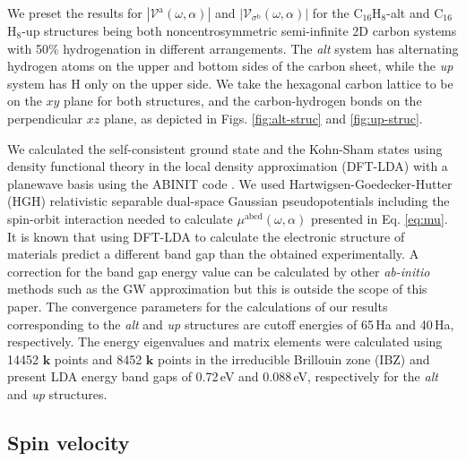 \documentclass[prb,11pt,tightenlines,twocolumn,aps]{revtex4-1}
\begin{document}
We preset the results for $|\mathcal{V}^{\mathrm{a}}(\omega,\alpha)|$ and
$|\mathcal{V}_{\sigma^{\mathrm{b}}}(\omega,\alpha)|$ for the C$_{16}$H$_{8}$-alt
and C$_{16}$H$_{8}$-up structures being both noncentrosymmetric semi-infinite 2D
carbon systems with 50\% hydrogenation in different arrangements. The \emph{alt}
system has alternating hydrogen atoms on the upper and bottom sides of the
carbon sheet, while the \emph{up} system has H only on the upper side. We take
the hexagonal carbon lattice to be on the $xy$ plane for both structures, and
the carbon-hydrogen bonds on the perpendicular $xz$ plane, as depicted in Figs.
\ref{fig:alt-struc} and \ref{fig:up-struc}.

We calculated the self-consistent ground state and the Kohn-Sham states using
density functional theory in the local density approximation (DFT-LDA) with a
planewave basis using the ABINIT code \cite{gonzeCPC09}. We used 
Hartwigsen-Goedecker-Hutter (HGH) relativistic separable dual-space Gaussian
pseudopotentials \cite{hartwigsenPRB98} including the spin-orbit interaction
needed to calculate $\mu^{\mathrm{abcd}}(\omega,\alpha)$ presented in Eq.
\eqref{eq:mu}.
% 
It is known that using DFT-LDA to calculate the electronic structure of
materials predict a different band gap than the obtained experimentally. A
correction for the band gap energy value can be calculated by other 
\emph{ab-initio} methods such as the GW approximation \cite{onidaRMP02} but this
is outside the scope of this paper.
% 
The convergence parameters for the calculations of our results corresponding to
the \emph{alt} and \emph{up} structures are cutoff energies of 65\,Ha and
40\,Ha, respectively. The energy eigenvalues and matrix elements were calculated
using 14452 $\mathbf{k}$ points and 8452 $\mathbf{k}$ points in the irreducible
Brillouin zone (IBZ) and present LDA energy band gaps of 0.72\,eV and 0.088\,eV,
respectively for the \emph{alt} and \emph{up} structures. 



\subsection{Spin velocity} %
\label{sec:res-spin_velocity}
\end{document}
